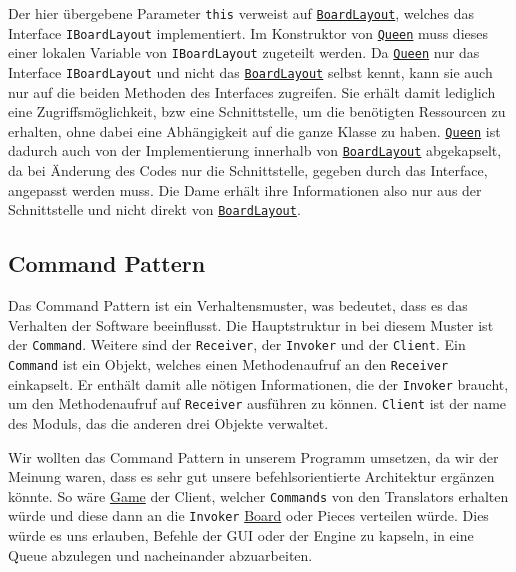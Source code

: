 \documentclass[
10pt, %
a4paper, %
oneside, %
headinclude,footinclude, %
BCOR5mm, %
]{scrartcl}
\begin{document}
\begin{onehalfspace}
Der hier übergebene Parameter \texttt{this} verweist auf \texttt{\href{https://github.com/schmida736/Chess-AdvancedSE/blob/main/Chess-AdvancedSE/Game\%20Elements/BoardLayout.cs}{BoardLayout}}, welches das Interface \texttt{IBoardLayout} implementiert. Im Konstruktor von \texttt{\href{https://github.com/schmida736/Chess-AdvancedSE/blob/main/Chess-AdvancedSE/Game\%20Elements/Pieces/Queen.cs}{Queen}} muss dieses einer lokalen Variable von \texttt{IBoardLayout} zugeteilt werden. Da \texttt{\href{https://github.com/schmida736/Chess-AdvancedSE/blob/main/Chess-AdvancedSE/Game\%20Elements/Pieces/Queen.cs}{Queen}} nur das Interface \texttt{IBoardLayout}
und nicht das \texttt{\href{https://github.com/schmida736/Chess-AdvancedSE/blob/main/Chess-AdvancedSE/Game\%20Elements/BoardLayout.cs}{BoardLayout}} selbst kennt, kann sie auch nur auf die beiden Methoden des Interfaces zugreifen. Sie erhält damit lediglich eine Zugriffsmöglichkeit, bzw eine Schnittstelle, um die benötigten Ressourcen zu erhalten, ohne dabei eine Abhängigkeit auf die ganze Klasse zu haben. \texttt{\href{https://github.com/schmida736/Chess-AdvancedSE/blob/main/Chess-AdvancedSE/Game\%20Elements/Pieces/Queen.cs}{Queen}} ist dadurch auch von der Implementierung innerhalb von \texttt{\href{https://github.com/schmida736/Chess-AdvancedSE/blob/main/Chess-AdvancedSE/Game\%20Elements/BoardLayout.cs}{BoardLayout}} abgekapselt, da bei Änderung des Codes nur die Schnittstelle, gegeben durch das Interface, angepasst werden muss. Die Dame erhält ihre Informationen also nur aus der Schnittstelle und nicht direkt von \texttt{\href{https://github.com/schmida736/Chess-AdvancedSE/blob/main/Chess-AdvancedSE/Game\%20Elements/BoardLayout.cs}{BoardLayout}}.
\subsection{Command Pattern}
Das Command Pattern ist ein Verhaltensmuster, was bedeutet, dass es das Verhalten der Software beeinflusst. Die Hauptstruktur in bei diesem Muster ist der \texttt{Command}. Weitere sind der \texttt{Receiver}, der \texttt{Invoker} und der \texttt{Client}. Ein \texttt{Command} ist ein Objekt, welches einen Methodenaufruf an den \texttt{Receiver} einkapselt. Er enthält damit alle nötigen Informationen, die der \texttt{Invoker} braucht, um den Methodenaufruf auf \texttt{Receiver} ausführen zu können. \texttt{Client} ist der name des Moduls, das die anderen drei Objekte verwaltet.

Wir wollten das Command Pattern in unserem Programm umsetzen, da wir der Meinung waren, dass es sehr gut unsere befehlsorientierte Architektur ergänzen könnte. So wäre \href{https://github.com/schmida736/Chess-AdvancedSE/blob/main/Chess-AdvancedSE/Game\%20Elements/Game.cs}{Game} der Client, welcher \texttt{Commands} von den Translators erhalten würde und diese dann an die \texttt{Invoker} \href{https://github.com/schmida736/Chess-AdvancedSE/blob/main/Chess-AdvancedSE/Game\%20Elements/Board.cs}{Board} oder Pieces verteilen würde.
Dies würde es uns erlauben, Befehle der GUI oder der Engine zu kapseln, in eine Queue abzulegen und nacheinander abzuarbeiten.


\end{onehalfspace}
\end{document}
